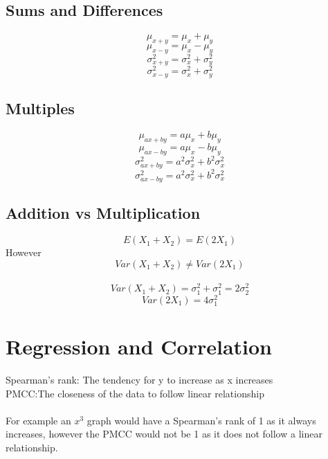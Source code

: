 \documentclass{article}[18pt]
\begin{document}
\subsection{Sums and Differences}
$$\mu_{x+y}=\mu_x+\mu_y$$
$$\mu_{x-y}=\mu_x-\mu_y$$
$$\sigma^2_{x+y}=\sigma^2_x+\sigma^2_y$$
$$\sigma^2_{x-y}=\sigma^2_x+\sigma^2_y$$
\subsection{Multiples}
$$\mu_{ax+by}=a\mu_x+b\mu_y$$
$$\mu_{ax-by}=a\mu_x-b\mu_y$$
$$\sigma^2_{ax+by}=a^2\sigma^2_x+b^2\sigma^2_x$$
$$\sigma^2_{ax-by}=a^2\sigma^2_x+b^2\sigma^2_x$$
\subsection{Addition vs Multiplication}
$$E(X_1+X_2)=E(2X_1)$$
However
$$Var(X_1+X_2)\neq Var(2X_1)$$
\\
$$Var(X_1+X_2)=\sigma_1^2+\sigma_1^2=2\sigma_2^2$$
$$Var(2X_1)=4\sigma^2_1$$
\section{Regression and Correlation}
Spearman's rank: The tendency for y to increase as x increases\\
PMCC:The closeness of the data to follow linear relationship\\
\\
For example an $x^3$ graph would have a Spearman's rank of 1 as it always increases, however the PMCC would not be 1 as it does not follow a linear relationship.
\end{document}
